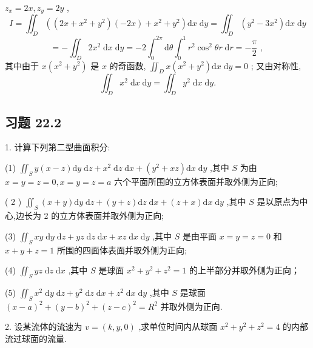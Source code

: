 \begin{solution}

\end{solution}
\({z}_{x} = {2x},{z}_{y} = {2y}\) ,
\[
I = {\iint }_{D}\left( {\left( {{2x} + {x}^{2} + {y}^{2}}\right) \left( {-{2x}}\right)  + {x}^{2} + {y}^{2}}\right) \mathrm{d}x\mathrm{\;d}y = {\iint }_{D}\left( {{y}^{2} - 3{x}^{2}}\right) \mathrm{d}x\mathrm{\;d}y
\]
\[
=  - {\iint }_{D}2{x}^{2}\mathrm{\;d}x\mathrm{\;d}y =  - 2{\int }_{0}^{2\pi }\mathrm{d}\theta {\int }_{0}^{1}{r}^{2}{\cos }^{2}{\theta r}\mathrm{\;d}r =  - \frac{\pi }{2}\text{ , }
\]
其中由于 \(x\left( {{x}^{2} + {y}^{2}}\right)\) 是 \(x\) 的奇函数, \({\iint }_{D}x\left( {{x}^{2} + {y}^{2}}\right) \mathrm{d}x\mathrm{\;d}y = 0\) ; 又由对称性,
\[
{\iint }_{D}{x}^{2}\mathrm{\;d}x\mathrm{\;d}y = {\iint }_{D}{y}^{2}\mathrm{\;d}x\mathrm{\;d}y.
\]
\subsection{习题 22.2}

1. 计算下列第二型曲面积分:

(1) \({\iint }_{S}y\left( {x - z}\right) \mathrm{d}y\mathrm{\;d}z + {x}^{2}\mathrm{\;d}z\mathrm{\;d}x + \left( {{y}^{2} + {xz}}\right) \mathrm{d}x\mathrm{\;d}y\) ,其中 \(S\) 为由 \(x = y = z = 0,x = y = z = a\) 六个平面所围的立方体表面并取外侧为正向;

( 2 ) \({\iint }_{S}\left( {x + y}\right) \mathrm{d}y\mathrm{\;d}z + \left( {y + z}\right) \mathrm{d}z\mathrm{\;d}x + \left( {z + x}\right) \mathrm{d}x\mathrm{\;d}y\) ,其中 \(S\) 是以原点为中心,边长为 2 的立方体表面并取外侧为正向;

(3) \({\iint }_{S}{xy}\mathrm{\;d}y\mathrm{\;d}z + {yz}\mathrm{\;d}z\mathrm{\;d}x + {xz}\mathrm{\;d}x\mathrm{\;d}y\) ,其中 \(S\) 是由平面 \(x = y = z = 0\) 和 \(x + y + z = 1\) 所围的四面体表面并取外侧为正向;

(4) \({\iint }_{S}{yz}\mathrm{\;d}z\mathrm{\;d}x\) ,其中 \(S\) 是球面 \({x}^{2} + {y}^{2} + {z}^{2} = 1\) 的上半部分并取外侧为正向；

(5) \({\iint }_{S}{x}^{2}\mathrm{\;d}y\mathrm{\;d}z + {y}^{2}\mathrm{\;d}z\mathrm{\;d}x + {z}^{2}\mathrm{\;d}x\mathrm{\;d}y\) ,其中 \(S\) 是球面 \({\left( x - a\right) }^{2} + {\left( y - b\right) }^{2} + {\left( z - c\right) }^{2} = {R}^{2}\) 并取外侧为正向.

2. 设某流体的流速为 \(v = \left( {k,y,0}\right)\) ,求单位时间内从球面 \({x}^{2} + {y}^{2} + {z}^{2} = 4\) 的内部流过球面的流量.

